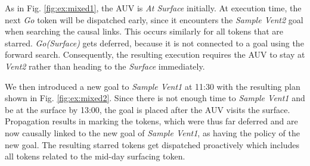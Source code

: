 As in Fig. \ref{fig:ex:mixed1}, the AUV is {\em At Surface} initially.
At execution time, the next {\em Go} token will be dispatched early,
since it encounters the {\em Sample Vent2} goal when searching the
causal links.  This occurs similarly for all tokens that are
starred. {\em Go(Surface)} gets deferred, because it is not connected
to a goal using the forward search. Consequently, the resulting
execution requires the AUV to stay at {\em Vent2} rather than heading
to the {\em Surface} immediately.


We then introduced a new goal to {\em Sample Vent1} at 11:30 with the
resulting plan shown in Fig. \ref{fig:ex:mixed2}. Since there is not
enough time to {\em Sample Vent1} and be at the surface by 13:00, the
goal is placed after the AUV visits the surface. Propagation results
in marking the tokens, which were thus far deferred and are now
causally linked to the new goal of {\em Sample Vent1}, as having the
policy of the new goal. The resulting starred tokens get dispatched
proactively which includes all tokens related to the mid-day surfacing
token.

